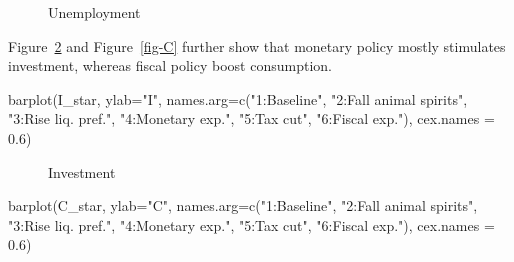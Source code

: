 \documentclass[
  letterpaper,
  DIV=11,
  numbers=noendperiod]{scrreprt}
\newenvironment{Shaded}{\begin{snugshade}}{\end{snugshade}}
\newcommand{\AttributeTok}[1]{\textcolor[rgb]{0.40,0.45,0.13}{#1}}
\newcommand{\FloatTok}[1]{\textcolor[rgb]{0.68,0.00,0.00}{#1}}
\newcommand{\FunctionTok}[1]{\textcolor[rgb]{0.28,0.35,0.67}{#1}}
\newcommand{\NormalTok}[1]{\textcolor[rgb]{0.00,0.23,0.31}{#1}}
\newcommand{\StringTok}[1]{\textcolor[rgb]{0.13,0.47,0.30}{#1}}
\begin{document}
\begin{figure}[H]


\caption{\label{fig-U}Unemployment}

\end{figure}%

Figure~\ref{fig-I} and Figure~\ref{fig-C} further show that monetary
policy mostly stimulates investment, whereas fiscal policy boost
consumption.

\begin{Shaded}
\begin{Highlighting}[]
\FunctionTok{barplot}\NormalTok{(I\_star, }\AttributeTok{ylab=}\StringTok{"I"}\NormalTok{, }\AttributeTok{names.arg=}\FunctionTok{c}\NormalTok{(}\StringTok{"1:Baseline"}\NormalTok{, }\StringTok{"2:Fall animal spirits"}\NormalTok{, }\StringTok{"3:Rise liq. pref."}\NormalTok{,}
                                      \StringTok{"4:Monetary exp."}\NormalTok{, }\StringTok{"5:Tax cut"}\NormalTok{, }\StringTok{"6:Fiscal exp."}\NormalTok{), }\AttributeTok{cex.names =} \FloatTok{0.6}\NormalTok{)}
\end{Highlighting}
\end{Shaded}

\begin{figure}[H]


\caption{\label{fig-I}Investment}

\end{figure}%

\begin{Shaded}
\begin{Highlighting}[]
\FunctionTok{barplot}\NormalTok{(C\_star, }\AttributeTok{ylab=}\StringTok{"C"}\NormalTok{, }\AttributeTok{names.arg=}\FunctionTok{c}\NormalTok{(}\StringTok{"1:Baseline"}\NormalTok{, }\StringTok{"2:Fall animal spirits"}\NormalTok{, }\StringTok{"3:Rise liq. pref."}\NormalTok{,}
                                      \StringTok{"4:Monetary exp."}\NormalTok{, }\StringTok{"5:Tax cut"}\NormalTok{, }\StringTok{"6:Fiscal exp."}\NormalTok{), }\AttributeTok{cex.names =} \FloatTok{0.6}\NormalTok{)}
\end{Highlighting}
\end{Shaded}
\end{document}

